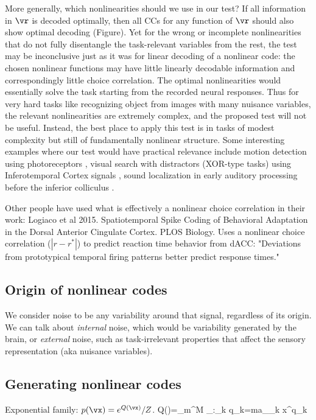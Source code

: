 \documentclass[11pt,twocolumn]{article}
\begin{document}
More generally, which nonlinearities should we use in our test? If all information in $\vr$ is decoded optimally, then all CCs for any function of $\vr$ should also show optimal decoding ({\color{red}Figure}). Yet for the wrong or incomplete nonlinearities that do not fully disentangle the task-relevant variables from the rest, the test may be inconclusive just as it was for linear decoding of a nonlinear code: the chosen nonlinear functions may have little linearly decodable information and correspondingly little choice correlation. The optimal nonlinearities would essentially solve the task starting from the recorded neural responses. Thus for very hard tasks like recognizing object from images with many nuisance variables, the relevant nonlinearities are extremely complex, and the proposed test will not be useful. Instead, the best place to apply this test is in tasks of modest complexity but still of fundamentally nonlinear structure. Some interesting examples where our test would have practical relevance include motion detection using photoreceptors \cite{Poggio}, visual search with distractors (XOR-type tasks) using Inferotemporal Cortex signals \cite{Rust}, sound localization in early auditory processing before the inferior colliculus \cite{}.

Other people have used what is effectively a nonlinear choice correlation in their work: Logiaco et al 2015. Spatiotemporal Spike Coding of Behavioral Adaptation in the Dorsal Anterior Cingulate Cortex. PLOS Biology. Uses a nonlinear choice correlation ($|r-r^*|$) to predict reaction time behavior from dACC: "Deviations from prototypical temporal firing patterns better predict response times."


\subsection{Origin of nonlinear codes}

We consider noise to be any variability around that signal, regardless of its origin. We can talk about {\em internal} noise, which would be variability generated by the brain, or {\em external} noise, such as task-irrelevant properties that affect the sensory representation (aka nuisance variables).


\subsection{Generating nonlinear codes}

Exponential family: $p(\vx)=e^{Q(\vx)}/Z$.
\be
Q(\vx)=\sum_m^M \sum_{\vq:\sum_k q_k=m}a_\vq \prod_k x^{q_k}
\ee
\end{document}
